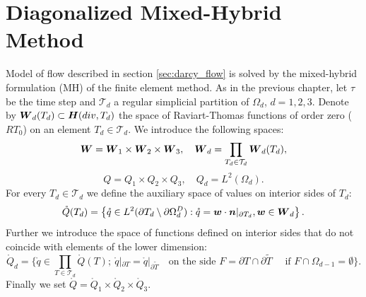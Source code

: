\section{Diagonalized Mixed-Hybrid Method}
\def\mr{\mathring}
Model of flow described in section \ref{sec:darcy_flow} is solved by
the mixed-hybrid formulation (MH) of the finite element method.
As in the previous chapter, let
$\tau$ be the time step and $\mathcal T_d$ a regular simplicial partition of $\Omega_d$, $d=1,2,3$.
Denote by $\mathbf{\boldsymbol{W}}_d(T_d)\subset \mathbf{\boldsymbol{H}}(div,T_d)$
 the space of Raviart-Thomas functions of order zero ($RT_0$) on an element $T_d\in 
\mathcal T_d$.
We introduce the following spaces:
\[
    \mathbf{\boldsymbol{W}} =  \mathbf{\boldsymbol{W}}_1 \times \mathbf{\boldsymbol{W}}_2 \times \mathbf{\boldsymbol{W}}_3,\quad
    \mathbf{\boldsymbol{W}}_d = \prod_{T_d\in \mathcal T_d} \mathbf{\boldsymbol{W}}_d(T_d),
\]
\begin{equation}
Q=Q_{1}\times Q_{2}\times Q_{3},
\quad
Q_{d}=L^{2}\left(  \Omega_{d}\right).
\end{equation}
For every $T_d\in \mathcal T_d$ we define the auxiliary space of values on interior sides of $T_d$:
\begin{equation}
    \mr Q(T_d)=\left\{  \mr q\in 
    L^{2}(\partial T_d \setminus  \partial\Omega_d^D):
    \mr q =\vc w\cdot \vc n|_{\partial T_d},
    \vc w\in\vc W_d%
    \right\}.
\end{equation}
Further we introduce the space of functions defined on interior sides that do not coincide with elements of the lower dimension:
\begin{equation}
    \mr Q_d=\Big\{
        \mr q\in\prod_{T \in \mathcal T_d} \mr Q(T);
        \ \mr q|_{\partial T}=\mr q|_{\partial \tilde T}%
        \quad\text{on the side }F=\partial T\cap\partial \tilde T
        \quad\text{ if }F\cap\Omega_{d-1}=\emptyset
    \Big\}.
\end{equation}
Finally we set $\mr Q = \mr Q_1 \times \mr Q_2 \times \mr Q_3$.

